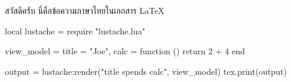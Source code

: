\documentclass{article}
\begin{document}
สวัสดีครับ นี่คือข้อความภาษาไทยในเอกสาร LaTeX


\begin{luacode*}
local lustache = require "lustache.lua"

view_model = {
  title = "Joe",
  calc = function ()
    return 2 + 4
  end
}

output = lustache:render("{{title}} spends {{calc}}", view_model)
tex.print(output)
\end{luacode*}
\end{document}
